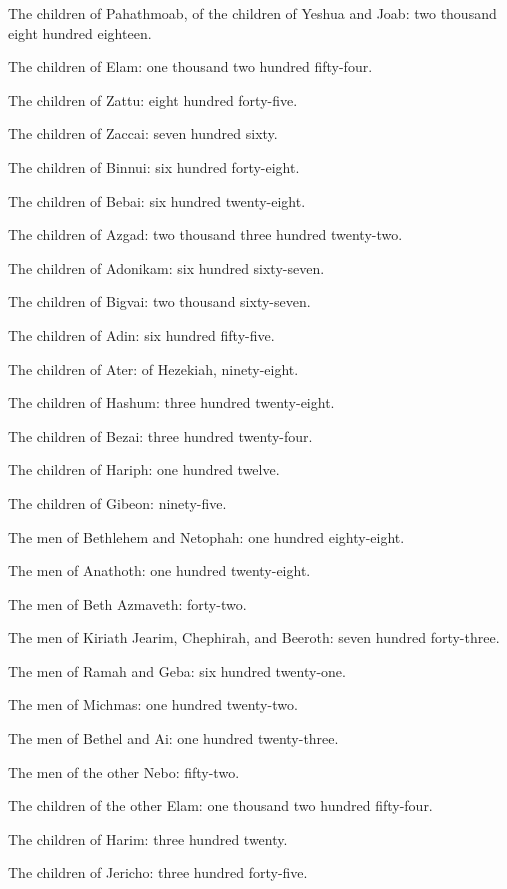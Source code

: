 \myverse{}The children of Pahathmoab, of the children of Yeshua
and Joab: two thousand eight hundred eighteen.

\myverse{}The children of Elam: one thousand two hundred fifty-four.

\myverse{}The children of Zattu: eight hundred forty-five.

\myverse{}The children of Zaccai: seven hundred sixty.

\myverse{}The children of Binnui: six hundred forty-eight.

\myverse{}The children of Bebai: six hundred twenty-eight.

\myverse{}The children of Azgad: two thousand three hundred
twenty-two.

\myverse{}The children of Adonikam: six hundred sixty-seven.

\myverse{}The children of Bigvai: two thousand sixty-seven.

\myverse{}The children of Adin: six hundred fifty-five.

\myverse{}The children of Ater: of Hezekiah, ninety-eight.

\myverse{}The children of Hashum: three hundred twenty-eight.

\myverse{}The children of Bezai: three hundred twenty-four.

\myverse{}The children of Hariph: one hundred twelve.

\myverse{}The children of Gibeon: ninety-five.

\myverse{}The men of Bethlehem and Netophah: one hundred eighty-eight.

\myverse{}The men of Anathoth: one hundred twenty-eight.

\myverse{}The men of Beth Azmaveth: forty-two.

\myverse{}The men of Kiriath Jearim, Chephirah, and Beeroth:
seven hundred forty-three.

\myverse{}The men of Ramah and Geba: six hundred twenty-one.

\myverse{}The men of Michmas: one hundred twenty-two.

\myverse{}The men of Bethel and Ai: one hundred twenty-three.

\myverse{}The men of the other Nebo: fifty-two.

\myverse{}The children of the other Elam: one thousand two hundred
fifty-four.

\myverse{}The children of Harim: three hundred twenty.

\myverse{}The children of Jericho: three hundred forty-five.


